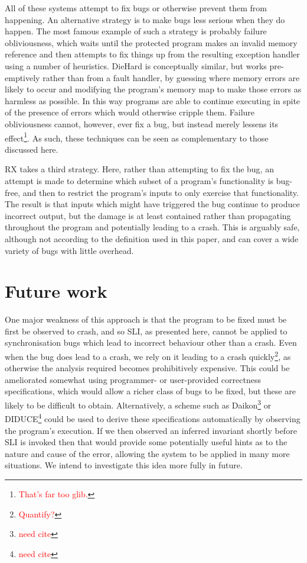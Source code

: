 \documentclass[10pt,twocolumn,preprint,natbib,authoryear]{sigplanconf}
\newcommand{\editorial}[1]{\textcolor{red}{\footnote{\textcolor{red}{#1}}}}
\newcommand{\needCite}{\editorial{need cite}}
\begin{document}
All of these systems attempt to fix bugs or otherwise prevent them
from happening.  An alternative strategy is to make bugs less serious
when they do happen.  The most famous example of such a strategy is
probably failure obliviousness\cite{Rinard2004}, which waits until the
protected program makes an invalid memory reference and then attempts
to fix things up from the resulting exception handler using a number
of heuristics.  DieHard\cite{Berger2006} is conceptually similar, but
works pre-emptively rather than from a fault handler, by guessing
where memory errors are likely to occur and modifying the program's
memory map to make those errors as harmless as possible.  In this way
programs are able to continue executing in spite of the presence of
errors which would otherwise cripple them.  Failure obliviousness
cannot, however, ever fix a bug, but instead merely lessens its
effect\editorial{That's far too glib.}.  As such, these techniques can
be seen as complementary to those discussed here.

RX\cite{Qin2007} takes a third strategy.  Here, rather than
attempting to fix the bug, an attempt is made to determine which
subset of a program's functionality is bug-free, and then to restrict
the program's inputs to only exercise that functionality.  The result
is that inputs which might have triggered the bug continue to produce
incorrect output, but the damage is at least contained rather than
propagating throughout the program and potentially leading to a crash.
This is arguably safe, although not according to the definition used
in this paper, and can cover a wide variety of bugs with little
overhead.

\section{Future work}

One major weakness of this approach is that the program to be fixed
must be first be observed to crash, and so SLI, as presented here,
cannot be applied to synchronisation bugs which lead to incorrect
behaviour other than a crash.  Even when the bug does lead to a crash,
we rely on it leading to a crash quickly\editorial{Quantify?}, as
otherwise the analysis required becomes prohibitively expensive.  This
could be ameliorated somewhat using programmer- or user-provided
correctness specifications, which would allow a richer class of bugs
to be fixed, but these are likely to be difficult to obtain.
Alternatively, a scheme such as Daikon\needCite{} or DIDUCE\needCite{}
could be used to derive these specifications automatically by
observing the program's execution.  If we then observed an inferred
invariant shortly before SLI is invoked then that would provide some
potentially useful hints as to the nature and cause of the error,
allowing the system to be applied in many more situations.  We intend
to investigate this idea more fully in future.
\end{document}
